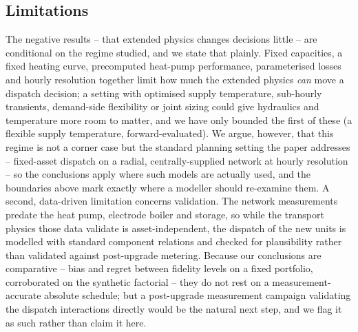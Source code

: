 \documentclass[a4paper,fleqn]{cas-dc}
\begin{document}
\subsection{Limitations}
The negative results -- that extended physics changes decisions little -- are conditional on
the regime studied, and we state that plainly. Fixed capacities, a fixed heating curve,
precomputed heat-pump performance, parameterised losses and hourly resolution together limit how
much the extended physics \emph{can} move a dispatch decision; a setting with optimised supply
temperature, sub-hourly transients, demand-side flexibility or joint sizing could give hydraulics
and temperature more room to matter, and we have only bounded the first of these (a flexible
supply temperature, forward-evaluated). We argue, however, that this regime is not a corner case
but the standard planning setting the paper addresses -- fixed-asset dispatch on a radial,
centrally-supplied network at hourly resolution -- so the conclusions apply where such models are
actually used, and the boundaries above mark exactly where a modeller should re-examine them.
A second, data-driven limitation concerns validation. The network measurements predate the heat
pump, electrode boiler and storage, so while the transport physics those data validate is
asset-independent, the dispatch of the new units is modelled with standard component relations
and checked for plausibility rather than validated against post-upgrade metering. Because our
conclusions are comparative -- bias and regret between fidelity levels on a fixed portfolio,
corroborated on the synthetic factorial -- they do not rest on a measurement-accurate absolute
schedule; but a post-upgrade measurement campaign validating the dispatch interactions directly
would be the natural next step, and we flag it as such rather than claim it here.

\end{document}

